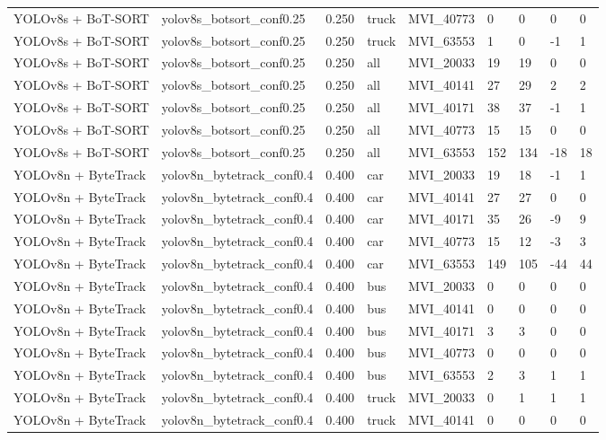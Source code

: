 \begin{tabular}{lllllllll}
YOLOv8s + BoT-SORT & yolov8s\_botsort\_conf0.25 & 0.250 & truck & MVI\_40773 & 0 & 0 & 0 & 0 \\
YOLOv8s + BoT-SORT & yolov8s\_botsort\_conf0.25 & 0.250 & truck & MVI\_63553 & 1 & 0 & -1 & 1 \\
YOLOv8s + BoT-SORT & yolov8s\_botsort\_conf0.25 & 0.250 & all & MVI\_20033 & 19 & 19 & 0 & 0 \\
YOLOv8s + BoT-SORT & yolov8s\_botsort\_conf0.25 & 0.250 & all & MVI\_40141 & 27 & 29 & 2 & 2 \\
YOLOv8s + BoT-SORT & yolov8s\_botsort\_conf0.25 & 0.250 & all & MVI\_40171 & 38 & 37 & -1 & 1 \\
YOLOv8s + BoT-SORT & yolov8s\_botsort\_conf0.25 & 0.250 & all & MVI\_40773 & 15 & 15 & 0 & 0 \\
YOLOv8s + BoT-SORT & yolov8s\_botsort\_conf0.25 & 0.250 & all & MVI\_63553 & 152 & 134 & -18 & 18 \\
YOLOv8n + ByteTrack & yolov8n\_bytetrack\_conf0.4 & 0.400 & car & MVI\_20033 & 19 & 18 & -1 & 1 \\
YOLOv8n + ByteTrack & yolov8n\_bytetrack\_conf0.4 & 0.400 & car & MVI\_40141 & 27 & 27 & 0 & 0 \\
YOLOv8n + ByteTrack & yolov8n\_bytetrack\_conf0.4 & 0.400 & car & MVI\_40171 & 35 & 26 & -9 & 9 \\
YOLOv8n + ByteTrack & yolov8n\_bytetrack\_conf0.4 & 0.400 & car & MVI\_40773 & 15 & 12 & -3 & 3 \\
YOLOv8n + ByteTrack & yolov8n\_bytetrack\_conf0.4 & 0.400 & car & MVI\_63553 & 149 & 105 & -44 & 44 \\
YOLOv8n + ByteTrack & yolov8n\_bytetrack\_conf0.4 & 0.400 & bus & MVI\_20033 & 0 & 0 & 0 & 0 \\
YOLOv8n + ByteTrack & yolov8n\_bytetrack\_conf0.4 & 0.400 & bus & MVI\_40141 & 0 & 0 & 0 & 0 \\
YOLOv8n + ByteTrack & yolov8n\_bytetrack\_conf0.4 & 0.400 & bus & MVI\_40171 & 3 & 3 & 0 & 0 \\
YOLOv8n + ByteTrack & yolov8n\_bytetrack\_conf0.4 & 0.400 & bus & MVI\_40773 & 0 & 0 & 0 & 0 \\
YOLOv8n + ByteTrack & yolov8n\_bytetrack\_conf0.4 & 0.400 & bus & MVI\_63553 & 2 & 3 & 1 & 1 \\
YOLOv8n + ByteTrack & yolov8n\_bytetrack\_conf0.4 & 0.400 & truck & MVI\_20033 & 0 & 1 & 1 & 1 \\
YOLOv8n + ByteTrack & yolov8n\_bytetrack\_conf0.4 & 0.400 & truck & MVI\_40141 & 0 & 0 & 0 & 0 \\

\end{tabular}
